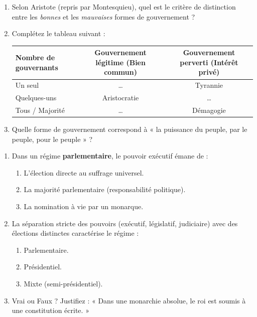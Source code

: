 \documentclass[11pt]{article}
\begin{document}
\begin{exercice}
\begin{enumerate}
    \item Selon Aristote (repris par Montesquieu), quel est le critère de distinction entre les \textit{bonnes} et les \textit{mauvaises} formes de gouvernement ?
    \item Complétez le tableau suivant :
    \begin{tabular}{|l|c|c|}
    \hline
    \textbf{Nombre de gouvernants} & \textbf{Gouvernement légitime (Bien commun)} & \textbf{Gouvernement perverti (Intérêt privé)} \\
    \hline
    Un seul & \ldots & Tyrannie \\
    \hline
    Quelques-uns & Aristocratie & \ldots \\
    \hline
    Tous / Majorité & \ldots & Démagogie \\
    \hline
    \end{tabular}
    \item Quelle forme de gouvernement correspond à « la puissance du peuple, par le peuple, pour le peuple » ?
\end{enumerate}
\end{exercice}

\begin{exercice}
\begin{enumerate}
    \item Dans un régime \textbf{parlementaire}, le pouvoir exécutif émane de :
    \begin{enumerate}
        \item L'élection directe au suffrage universel.
        \item La majorité parlementaire (responsabilité politique).
        \item La nomination à vie par un monarque.
    \end{enumerate}
    \item La séparation stricte des pouvoirs (exécutif, législatif, judiciaire) avec des élections distinctes caractérise le régime :
    \begin{enumerate}
        \item Parlementaire.
        \item Présidentiel.
        \item Mixte (semi-présidentiel).
    \end{enumerate}
    \item Vrai ou Faux ? Justifiez : « Dans une monarchie absolue, le roi est soumis à une constitution écrite. »
\end{enumerate}
\end{exercice}
\end{document}

